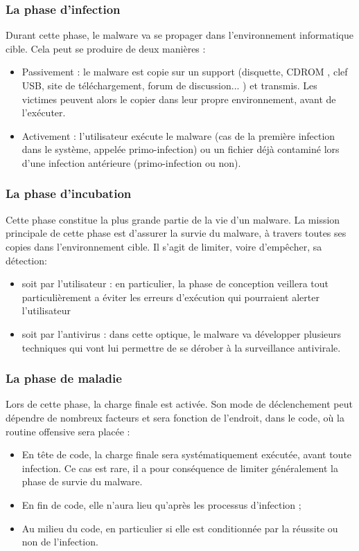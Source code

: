 \subsubsection{La phase d'infection}
Durant cette phase, le malware va se propager dans l'environnement informatique cible. Cela peut se produire de deux manières :
\begin{itemize}
\item Passivement : le malware est copie sur un support (disquette, CDROM , clef USB, site de téléchargement, forum de discussion... ) et transmis. Les victimes peuvent alors le copier dans leur propre environnement, avant de l'exécuter. 
\item Activement : l'utilisateur exécute le malware (cas de la première infection dans le système, appelée primo-infection) ou un fichier déjà contaminé lors d'une infection antérieure (primo-infection ou non).
\end{itemize}

\subsubsection{La phase d'incubation}
Cette phase constitue la plus grande partie de la vie d'un malware. La mission principale de cette phase est d'assurer la survie du malware, à travers toutes ses copies dans l'environnement cible. Il s'agit de limiter, voire  d'empêcher, sa détection:
\begin{itemize}
\item soit par l'utilisateur : en particulier, la phase de conception veillera tout particulièrement a éviter les erreurs d'exécution qui pourraient alerter l'utilisateur 
\item soit par l'antivirus : dans cette optique, le malware va développer plusieurs techniques qui vont lui permettre de se dérober à la surveillance antivirale.
\end{itemize}

\subsubsection{La phase de maladie}
Lors de cette phase, la charge finale est activée. Son mode de déclenchement peut dépendre de nombreux facteurs et sera fonction de l'endroit, dans le code, où la routine offensive sera placée :
\begin{itemize}
\item En tête de code, la charge finale sera systématiquement exécutée, avant
toute infection. Ce cas est rare, il a pour conséquence de limiter généralement la phase de survie du malware.
\item En fin de code, elle n'aura lieu qu'après les processus d'infection ;
\item Au milieu du code, en particulier si elle est conditionnée par la réussite
ou non de l'infection. 
\end{itemize}



